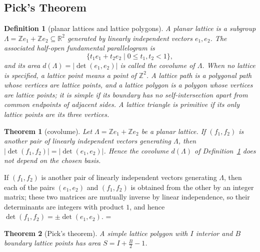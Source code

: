 \documentclass[11pt]{article}
\makeatletter
\theoremstyle{ntstyle}
\newtheorem{theorem}{Theorem}[subsection]
\newtheorem{definition}{Definition}[subsection]
\let\nt@closedisplay\]
\def\nt@guardedclose{\@ifnextchar\par{\nt@closeafterpar}{\@ifnextchar\end{\postdisplaypenalty\@M\nt@closedisplay}{\nt@closedisplay}}}
\def\nt@closeafterpar\par{\@ifnextchar\par{\nt@closeafterpar}{\@ifnextchar\end{\postdisplaypenalty\@M\nt@closedisplay\par}{\nt@closedisplay\par}}}
\renewenvironment{proof}[1][\proofname]{\par
  \pushQED{\qed}\normalfont\topsep\medskipamount\edef\nt@afterproof{\@endparpenalty=\the\@endparpenalty\relax}\@beginparpenalty\@M\@endparpenalty\@M\let\]\nt@guardedclose\trivlist\item[]\textit{#1\@addpunct{.}} \ignorespaces}{\ifvmode\addpenalty\@M\fi\popQED\nt@afterproof\endtrivlist\@endpefalse}
\makeatother
\begin{document}
\subsection{Pick's Theorem}

\begin{definition}[planar lattices and lattice polygons]\label{def:10.8.1}
	A planar lattice is a subgroup
	$\Lambda=\mathbb{Z}e_1+\mathbb{Z}e_2\subseteq\mathbb{R}^2$ generated by
	linearly independent vectors $e_1,e_2$. The associated half-open
	fundamental parallelogram is
	\[
		\{t_1e_1+t_2e_2\mid 0\le t_1,t_2<1\},
	\]
	and its area $d(\Lambda)=|\det(e_1,e_2)|$ is called the covolume of
	$\Lambda$. When no lattice
	is specified, a lattice point means a point of $\mathbb{Z}^2$. A lattice
	path is a polygonal path whose vertices are lattice points, and a lattice
	polygon is a polygon whose vertices are lattice points; it is simple if
	its boundary has no self-intersection apart from common endpoints of
	adjacent sides. A lattice triangle is primitive if its only lattice
	points are its three vertices.
\end{definition}
\begin{theorem}[covolume]\label{thm:10.8.1}
	Let $\Lambda=\mathbb{Z}e_1+\mathbb{Z}e_2$ be a planar lattice. If $(f_1,f_2)$ is
	another pair of linearly independent vectors generating $\Lambda$, then
	$|\det(f_1,f_2)|=|\det(e_1,e_2)|$. Hence the covolume $d(\Lambda)$ of Definition~\ref{def:10.8.1} does
	not depend on the chosen basis.
\end{theorem}

\begin{proof} If $(f_1,f_2)$ is
	another pair of linearly independent vectors generating $\Lambda$, then
	each of the pairs $(e_1,e_2)$ and $(f_1,f_2)$ is obtained from the other
	by an integer matrix; these two matrices are mutually inverse by linear
	independence, so their determinants are integers with product $1$, and
	hence $\det(f_1,f_2)=\pm\det(e_1,e_2)$.
\end{proof}
\begin{theorem}[Pick's theorem]\label{thm:10.8.2} A simple lattice polygon
	with $I$ interior and $B$ boundary lattice points has area $S = I +
		\tfrac{B}{2} - 1$.
\end{theorem}
\end{document}
